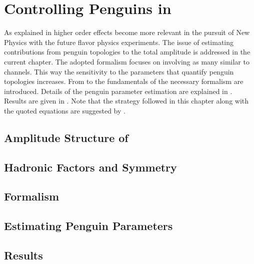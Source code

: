 
\chapter{Controlling Penguins in \phis}
\label{Penguins}

As explained in  higher order effects become more relevant in the pursuit
of New Physics with the future flavor physics experiments. The issue of estimating contributions from
penguin topologies to the total \BsJpsiPhi amplitude is addressed in the current chapter. The adopted
formalism focuses on involving as many similar to \BsJpsiPhi channels. This way the sensitivity to the
parameters that quantify penguin topologies increases. From  to
 the fundamentals of the necessary formalism are introduced.
Details of the penguin parameter estimation are explained in .
Results are given in . Note that the strategy followed in this chapter
along with the quoted equations are suggested by \cite{Fleischer:1999zi,Faller:2008gt,DeBruyn:2014oga}.

\section{Amplitude Structure of \BsJpsiPhi}
\label{jpsiphi_amp_struct}


\section{Hadronic Factors and \grpsuthree Symmetry}
\label{had_pars_suthree}


\section{Formalism}
\label{penguin_formalism}


\section{Estimating Penguin Parameters}
\label{penguin_more_chanells}


\section{Results}
\label{penguin_results}

